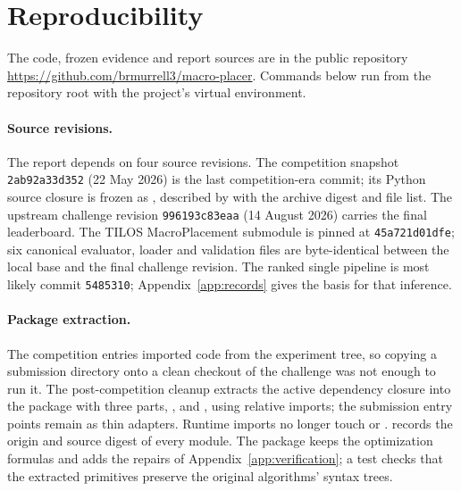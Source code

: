\section{Reproducibility}\label{app:repro}

The code, frozen evidence and report sources are in the public repository
\url{https://github.com/brmurrell3/macro-placer}. Commands below run from the
repository root with the project's virtual environment.

\paragraph{Source revisions.} The report depends on four source revisions. The competition
snapshot \texttt{2ab92a33d352} (22 May 2026) is the last competition-era commit; its
Python source closure is frozen as ,
described by  with the archive digest and file list. The
upstream challenge revision \texttt{996193c83eaa} (14 August 2026) carries the final
leaderboard. The TILOS MacroPlacement submodule is pinned at \texttt{45a721d01dfe};
six canonical evaluator, loader and validation files are byte-identical between the
local base and the final challenge revision. The ranked single pipeline is most
likely commit \texttt{5485310}; Appendix~\ref{app:records} gives the basis for that
inference.

\paragraph{Package extraction.} The competition entries imported code from the
experiment tree, so copying a submission directory onto a clean checkout of the
challenge was not enough to run it. The post-competition cleanup extracts the active
dependency closure into the package  with three parts,
,  and , using
relative imports; the submission entry points remain as thin adapters. Runtime
imports no longer touch  or .
 records the origin and source digest of every
module. The package keeps the optimization formulas and adds the repairs of
Appendix~\ref{app:verification}; a test checks that the extracted primitives
preserve the original algorithms' syntax trees.

